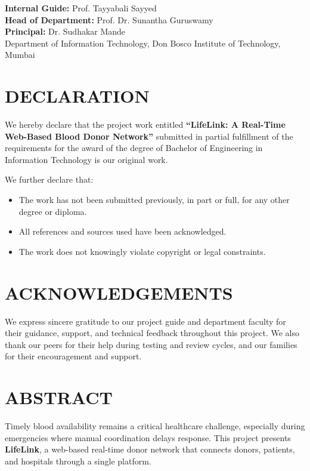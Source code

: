 \documentclass[12pt,a4paper]{report}
\begin{document}
\vspace{20pt}
\textbf{Internal Guide:} Prof. Tayyabali Sayyed\\
\textbf{Head of Department:} Prof. Dr. Sunantha Guruswamy\\
\textbf{Principal:} Dr. Sudhakar Mande\\
Department of Information Technology, Don Bosco Institute of Technology, Mumbai

\chapter*{DECLARATION}
We hereby declare that the project work entitled \textbf{``LifeLink: A Real-Time Web-Based Blood Donor Network''} submitted in partial fulfillment of the requirements for the award of the degree of Bachelor of Engineering in Information Technology is our original work.

We further declare that:
\begin{itemize}[leftmargin=1.5em]
\item The work has not been submitted previously, in part or full, for any other degree or diploma.
\item All references and sources used have been acknowledged.
\item The work does not knowingly violate copyright or legal constraints.
\end{itemize}

\chapter*{ACKNOWLEDGEMENTS}
We express sincere gratitude to our project guide and department faculty for their guidance, support, and technical feedback throughout this project. We also thank our peers for their help during testing and review cycles, and our families for their encouragement and support.

\chapter*{ABSTRACT}
Timely blood availability remains a critical healthcare challenge, especially during emergencies where manual coordination delays response. This project presents \textbf{LifeLink}, a web-based real-time donor network that connects donors, patients, and hospitals through a single platform.
\end{document}
